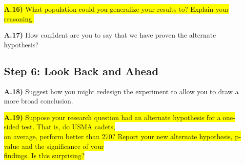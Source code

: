 \documentclass{article}
\newif\ifPrintSolution
\newcommand{\sol}[1]{\ifPrintSolution {\color{blue} #1 } \fi}
\begin{document}
\sol{No,  observational units from different regiments did not have an equal chance of being selected and so we cannot generalize these results to populations outside of 1st REG.}

\vspace{0.35in}

\colorbox{yellow}{\textbf{A.16)} What population could you generalize your results to? Explain your reasoning.}

\sol{We can generalize these results to the 1st Regiment population of cadets, as those cadets had an equal probability of being sampled for this study.}

\vspace{0.25in}

\textbf{A.17)} How confident are you to say that we have proven the alternate hypothesis?

\sol{We never say we proved or disproved a hypothesis, only that we have very strong evidence against the null hypothesis.}

\vspace{0.1in}


\subsection*{Step 6: Look Back and Ahead}

\textbf{A.18)} Suggest how you might redesign the experiment to allow you to draw a more broad conclusion.

\sol{To generalize to the USMA Corps of Cadets, we would randomly sample from the entire population of the corps of cadets instead of just one regiment. To generalize to all cadets, we would need to be able to randomly sample from the Corps of Cadets, ROTC, and G2G populations with equal probability per cadet.}

\vspace{0.25in}

\colorbox{yellow}{\textbf{A.19)} Suppose your research question had an alternate hypothesis for a one-sided test. That is, do USMA cadets,}\\ \colorbox{yellow}{on average, perform better than 270? Report your new alternate hypothesis, p-value  and the significance of your} \\ \colorbox{yellow}{findings. Is this surprising?}

\sol{$H_a: \mu > 270; \; \; \; 1 - pt(19.99953, 292)) = 0$\\
This is not surprising, it should be half the two-sided test, and $\frac{1}{2}$ of 0 is 0.}
\end{document}
